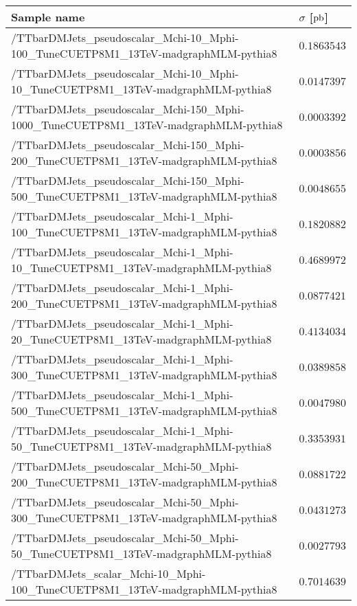 \begin{table}[!ht]
\centering
\begin{tabular}{|l|l|}
\hline
Sample name                                    & $\sigma$ [$\mathrm{pb}$]\\
\hline
/TTbarDMJets\_pseudoscalar\_Mchi-10\_Mphi-100\_TuneCUETP8M1\_13TeV-madgraphMLM-pythia8          & $0.1863543$ \\
/TTbarDMJets\_pseudoscalar\_Mchi-10\_Mphi-10\_TuneCUETP8M1\_13TeV-madgraphMLM-pythia8            & $0.0147397$ \\
/TTbarDMJets\_pseudoscalar\_Mchi-150\_Mphi-1000\_TuneCUETP8M1\_13TeV-madgraphMLM-pythia8      & $0.0003392$ \\
/TTbarDMJets\_pseudoscalar\_Mchi-150\_Mphi-200\_TuneCUETP8M1\_13TeV-madgraphMLM-pythia8      &  $0.0003856$ \\
/TTbarDMJets\_pseudoscalar\_Mchi-150\_Mphi-500\_TuneCUETP8M1\_13TeV-madgraphMLM-pythia8      & $0.0048655$ \\
/TTbarDMJets\_pseudoscalar\_Mchi-1\_Mphi-100\_TuneCUETP8M1\_13TeV-madgraphMLM-pythia8      & $0.1820882$ \\
/TTbarDMJets\_pseudoscalar\_Mchi-1\_Mphi-10\_TuneCUETP8M1\_13TeV-madgraphMLM-pythia8      &   $0.4689972$ \\
/TTbarDMJets\_pseudoscalar\_Mchi-1\_Mphi-200\_TuneCUETP8M1\_13TeV-madgraphMLM-pythia8      &  $0.0877421$ \\ 
/TTbarDMJets\_pseudoscalar\_Mchi-1\_Mphi-20\_TuneCUETP8M1\_13TeV-madgraphMLM-pythia8      &    $0.4134034$ \\
/TTbarDMJets\_pseudoscalar\_Mchi-1\_Mphi-300\_TuneCUETP8M1\_13TeV-madgraphMLM-pythia8      &  $0.0389858$ \\
/TTbarDMJets\_pseudoscalar\_Mchi-1\_Mphi-500\_TuneCUETP8M1\_13TeV-madgraphMLM-pythia8      &  $0.0047980$ \\
/TTbarDMJets\_pseudoscalar\_Mchi-1\_Mphi-50\_TuneCUETP8M1\_13TeV-madgraphMLM-pythia8      &  $0.3353931$ \\
/TTbarDMJets\_pseudoscalar\_Mchi-50\_Mphi-200\_TuneCUETP8M1\_13TeV-madgraphMLM-pythia8      &$0.0881722$ \\
/TTbarDMJets\_pseudoscalar\_Mchi-50\_Mphi-300\_TuneCUETP8M1\_13TeV-madgraphMLM-pythia8      &$0.0431273$ \\
/TTbarDMJets\_pseudoscalar\_Mchi-50\_Mphi-50\_TuneCUETP8M1\_13TeV-madgraphMLM-pythia8      &$0.0027793$ \\
\hline
/TTbarDMJets\_scalar\_Mchi-10\_Mphi-100\_TuneCUETP8M1\_13TeV-madgraphMLM-pythia8      &  $0.7014639$ \\

\end{tabular}
\end{table}
